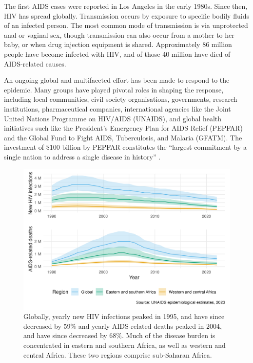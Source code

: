 \documentclass[a4paper, nobind]{templates/ociamthesis}
\begin{document}
The first AIDS cases were reported in Los Angeles in the early 1980s.
Since then, HIV has spread globally.
Transmission occurs by exposure to specific bodily fluids of an infected person.
The most common mode of transmission is via unprotected anal or vaginal sex, though transmission can also occur from a mother to her baby, or when drug injection equipment is shared.
Approximately 86 million people have become infected with HIV, and of those 40 million have died of AIDS-related causes.

An ongoing global and multifaceted effort has been made to respond to the epidemic.
Many groups have played pivotal roles in shaping the response, including local communities, civil society organisations, governments, research institutions, pharmaceutical companies, international agencies like the Joint United Nations Programme on HIV/AIDS (UNAIDS), and global health initiatives such like the President's Emergency Plan for AIDS Relief (PEPFAR) and the Global Fund to Fight AIDS, Tuberculosis, and Malaria (GFATM).
The investment of \$100 billion by PEPFAR constitutes the ``largest commitment by a single nation to address a single disease in history'' \autocite{pepfar2022}.



\begin{figure}

{\centering \includegraphics[width=0.95\linewidth]{figures/hiv-aids/overall-picture} 

}

\caption{Globally, yearly new HIV infections peaked in 1995, and have since decreased by 59\% and yearly AIDS-related deaths peaked in 2004, and have since decreased by 68\%. Much of the disease burden is concentrated in eastern and southern Africa, as well as western and central Africa. These two regions comprise sub-Saharan Africa.}\label{fig:overall-picture}
\end{figure}
\end{document}

